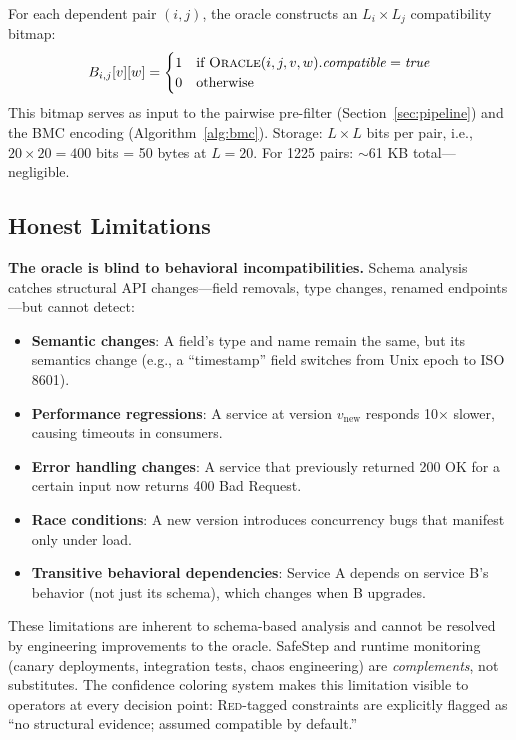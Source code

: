 \documentclass[10pt,twocolumn]{article}
\begin{document}
For each dependent pair $(i,j)$, the oracle constructs an $L_i \times L_j$ compatibility bitmap:
\[
  B_{i,j}[v][w] = \begin{cases} 1 & \text{if } \textsc{Oracle}(i,j,v,w).\mathit{compatible} = \mathit{true} \\ 0 & \text{otherwise} \end{cases}
\]
This bitmap serves as input to the pairwise pre-filter (Section~\ref{sec:pipeline}) and the BMC encoding (Algorithm~\ref{alg:bmc}). Storage: $L \times L$ bits per pair, i.e., $20 \times 20 = 400$ bits = 50 bytes at $L = 20$. For 1225 pairs: $\sim$61 KB total---negligible.

\subsection{Honest Limitations}
\label{sec:oracle-limits}

\textbf{The oracle is blind to behavioral incompatibilities.} Schema analysis catches structural API changes---field removals, type changes, renamed endpoints---but cannot detect:
\begin{itemize}
\item \textbf{Semantic changes}: A field's type and name remain the same, but its semantics change (e.g., a ``timestamp'' field switches from Unix epoch to ISO 8601).
\item \textbf{Performance regressions}: A service at version $v_{\mathrm{new}}$ responds 10$\times$ slower, causing timeouts in consumers.
\item \textbf{Error handling changes}: A service that previously returned 200 OK for a certain input now returns 400 Bad Request.
\item \textbf{Race conditions}: A new version introduces concurrency bugs that manifest only under load.
\item \textbf{Transitive behavioral dependencies}: Service A depends on service B's behavior (not just its schema), which changes when B upgrades.
\end{itemize}

These limitations are inherent to schema-based analysis and cannot be resolved by engineering improvements to the oracle. SafeStep and runtime monitoring (canary deployments, integration tests, chaos engineering) are \emph{complements}, not substitutes. The confidence coloring system makes this limitation visible to operators at every decision point: \textsc{Red}-tagged constraints are explicitly flagged as ``no structural evidence; assumed compatible by default.''
\end{document}
